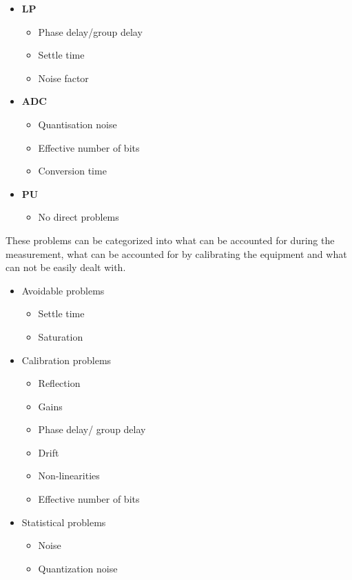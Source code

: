 \begin{minipage}{0.48\textwidth}
\begin{itemize}
\item \textbf{\Gls{LP}}
	\begin{itemize}
	\item Phase delay/group delay
	\item Settle time
	\item Noise factor
	\end{itemize}
\end{itemize}
\end{minipage}
\begin{minipage}{0.48\textwidth}
\begin{itemize}
\item \textbf{\Gls{ADC}}
	\begin{itemize}
	\item Quantisation noise
	\item Effective number of bits
	\item Conversion time
	\end{itemize}
\end{itemize}
\end{minipage}
\begin{minipage}{0.48\textwidth}
\begin{itemize}
\item \textbf{\Gls{PU}}
	\begin{itemize}
	 \item No direct problems
	\end{itemize}
\end{itemize}
\end{minipage}


These problems can be categorized into what can be accounted for during the measurement, what can be accounted for by calibrating the equipment and what can not be easily dealt with.

\begin{itemize}
\item Avoidable problems
	\begin{itemize}
	\item Settle time
	\item Saturation
	\end{itemize}
\item Calibration problems
	\begin{itemize}
	\item Reflection
	\item Gains
	\item Phase delay/ group delay
	\item Drift
	\item Non-linearities
	\item Effective number of bits
	\end{itemize}
\item Statistical problems
	\begin{itemize}
	\item Noise
	\item Quantization noise
	\end{itemize}
\end{itemize}

